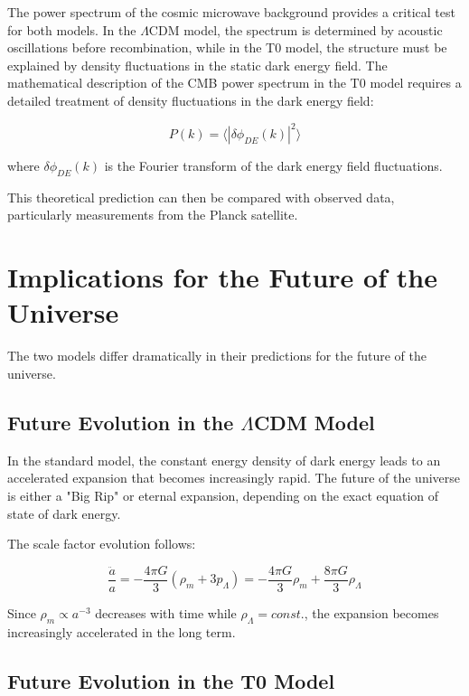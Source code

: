 \documentclass[a4paper,12pt]{article}
\begin{document}
The power spectrum of the cosmic microwave background provides a critical test for both models. In the $\Lambda$CDM model, the spectrum is determined by acoustic oscillations before recombination, while in the T0 model, the structure must be explained by density fluctuations in the static dark energy field. The mathematical description of the CMB power spectrum in the T0 model requires a detailed treatment of density fluctuations in the dark energy field:

\begin{equation}
	P(k) = \langle|\delta\phi_{DE}(k)|^2\rangle
\end{equation}

where $\delta\phi_{DE}(k)$ is the Fourier transform of the dark energy field fluctuations.

This theoretical prediction can then be compared with observed data, particularly measurements from the Planck satellite.

\section{Implications for the Future of the Universe}

The two models differ dramatically in their predictions for the future of the universe.

\subsection{Future Evolution in the $\Lambda$CDM Model}

In the standard model, the constant energy density of dark energy leads to an accelerated expansion that becomes increasingly rapid. The future of the universe is either a "Big Rip" or eternal expansion, depending on the exact equation of state of dark energy.

The scale factor evolution follows:

\begin{equation}
	\frac{\ddot{a}}{a} = -\frac{4\pi G}{3}(\rho_m + 3p_\Lambda) = -\frac{4\pi G}{3}\rho_m + \frac{8\pi G}{3}\rho_\Lambda
\end{equation}

Since $\rho_m \propto a^{-3}$ decreases with time while $\rho_\Lambda = const.$, the expansion becomes increasingly accelerated in the long term.

\subsection{Future Evolution in the T0 Model}
\end{document}
